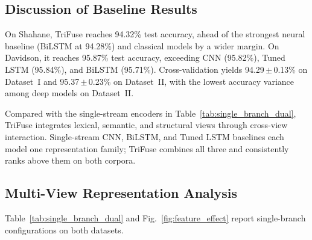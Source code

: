 \subsection{Discussion of Baseline Results}

On Shahane, TriFuse reaches 94.32\% test accuracy, ahead of the strongest neural baseline (BiLSTM at 94.28\%) and classical models by a wider margin. On Davidson, it reaches 95.87\% test accuracy, exceeding CNN (95.82\%), Tuned LSTM (95.84\%), and BiLSTM (95.71\%). Cross-validation yields 94.29\,$\pm$\,0.13\% on Dataset~I and 95.37\,$\pm$\,0.23\% on Dataset~II, with the lowest accuracy variance among deep models on Dataset~II.

Compared with the single-stream encoders in Table~\ref{tab:single_branch_dual}, TriFuse integrates lexical, semantic, and structural views through cross-view interaction. Single-stream CNN, BiLSTM, and Tuned LSTM baselines each model one representation family; TriFuse combines all three and consistently ranks above them on both corpora.

\subsection{Multi-View Representation Analysis}

Table~\ref{tab:single_branch_dual} and Fig.~\ref{fig:feature_effect} report single-branch configurations on both datasets.

\begin{table}[!t]
\caption{Single-Branch Performance}
\label{tab:single_branch_dual}
\centering
{}
\end{table}

